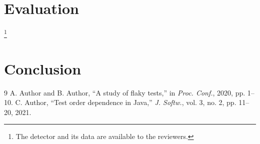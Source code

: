 \section{Evaluation}
\lipsum[5-6]\footnote{The detector and its data are available to the reviewers.}

\section{Conclusion}
\lipsum[7]

\begin{thebibliography}{9}
 A. Author and B. Author, ``A study of flaky tests,'' in \emph{Proc. Conf.}, 2020, pp. 1--10.
 C. Author, ``Test order dependence in Java,'' \emph{J. Softw.}, vol. 3, no. 2, pp. 11--20, 2021.
\end{thebibliography}
